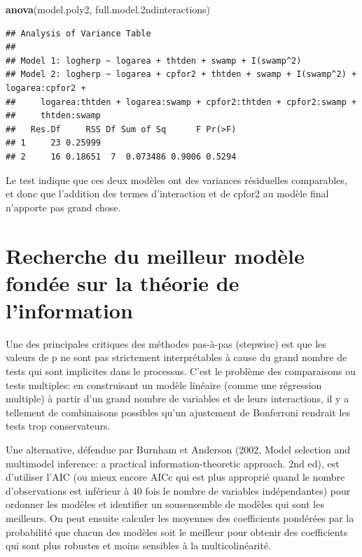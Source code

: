 \documentclass[
  12pt,
]{book}
\newenvironment{Shaded}{\begin{snugshade}}{\end{snugshade}}
\newcommand{\FloatTok}[1]{\textcolor[rgb]{0.00,0.00,0.81}{#1}}
\newcommand{\KeywordTok}[1]{\textcolor[rgb]{0.13,0.29,0.53}{\textbf{#1}}}
\newcommand{\NormalTok}[1]{#1}
\begin{document}
\begin{Shaded}
\begin{Highlighting}[]
\KeywordTok{anova}\NormalTok{(model.poly2, full.model}\FloatTok{.2}\NormalTok{ndinteractions)}
\end{Highlighting}
\end{Shaded}

\begin{verbatim}
## Analysis of Variance Table
## 
## Model 1: logherp ~ logarea + thtden + swamp + I(swamp^2)
## Model 2: logherp ~ logarea + cpfor2 + thtden + swamp + I(swamp^2) + logarea:cpfor2 + 
##     logarea:thtden + logarea:swamp + cpfor2:thtden + cpfor2:swamp + 
##     thtden:swamp
##   Res.Df     RSS Df Sum of Sq      F Pr(>F)
## 1     23 0.25999                           
## 2     16 0.18651  7  0.073486 0.9006 0.5294
\end{verbatim}

Le test indique que ces deux modèles ont des variances résiduelles comparables, et donc que l'addition des termes d'interaction et de cpfor2 au modèle final n'apporte pas grand chose.

\hypertarget{recherche-du-meilleur-moduxe8le-fonduxe9e-sur-la-thuxe9orie-de-linformation}{%
\section{Recherche du meilleur modèle fondée sur la théorie de l'information}\label{recherche-du-meilleur-moduxe8le-fonduxe9e-sur-la-thuxe9orie-de-linformation}}

Une des principales critiques des méthodes pas-à-pas (stepwise) est que les valeurs de p ne sont pas strictement interprétables à cause du grand nombre de tests qui sont implicites dans le processus. C'est le problème des comparaisons ou tests multiples: en construisant un modèle linéaire (comme une régression multiple) à partir d'un grand nombre de variables et de leurs interactions, il y a tellement de combinaisons possibles qu'un ajustement de Bonferroni rendrait les tests trop conservateurs.

Une alternative, défendue par Burnham et Anderson (2002, Model selection and multimodel inference: a practical information-theoretic approach. 2nd ed), est d'utiliser l'AIC (ou mieux encore AICc qui est plus approprié quand le nombre d'observations est inférieur à 40 fois le nombre de variables indépendantes) pour ordonner les modèles et identifier un sousensemble de modèles qui sont les meilleurs. On peut ensuite calculer les moyennes des coefficients pondérées par la probabilité que chacun des modèles soit le meilleur pour obtenir des coefficients qui sont plus robustes et moins sensibles à la multicolinéarité.
\end{document}

